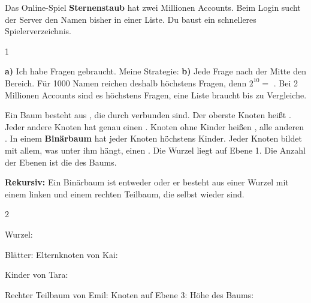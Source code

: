 \documentclass[11pt,a4paper]{article}
\begin{document}

Das Online-Spiel \textbf{Sternenstaub} hat zwei Millionen Accounts. Beim Login sucht der Server den Namen bisher in einer Liste. Du baust ein schnelleres Spielerverzeichnis. 

\begin{aufgabe}{1}
\begin{lueckentext}
\textbf{a)} Ich habe  Fragen gebraucht. Meine Strategie:
\textbf{b)} Jede Frage nach der Mitte  den Bereich. Für 1000 Namen reichen deshalb höchstens  Fragen, denn $2^{10} =$ . Bei 2 Millionen Accounts sind es höchstens  Fragen, eine Liste braucht bis zu  Vergleiche.
\end{lueckentext}
\end{aufgabe}

\begin{merke}
\begin{lueckentext}
Ein Baum besteht aus , die durch  verbunden sind. Der oberste Knoten heißt . Jeder andere Knoten hat genau einen . Knoten ohne Kinder heißen , alle anderen . In einem \textbf{Binärbaum} hat jeder Knoten höchstens  Kinder. Jeder Knoten bildet mit allem, was unter ihm hängt, einen . Die Wurzel liegt auf Ebene 1. Die Anzahl der Ebenen ist die  des Baums.\par
\textbf{Rekursiv:} Ein Binärbaum ist entweder  oder er besteht aus einer Wurzel mit einem linken und einem rechten Teilbaum, die selbst wieder  sind.
\end{lueckentext}
\end{merke}

\begin{aufgabe}{2}
\begin{minipage}[t]{0.5\linewidth}
\vspace{0pt}\centering
\verzeichnisbaum[scale=0.98,every node/.append style={transform shape}]
\end{minipage}\hfill
\begin{minipage}[t]{0.47\linewidth}
\vspace{0pt}\lueckentext
Wurzel: \par
Blätter: 
Elternknoten von Kai: \par
Kinder von Tara: \par
Rechter Teilbaum von Emil: 
Knoten auf Ebene 3: 
Höhe des Baums: 
\end{minipage}
\end{aufgabe}
\end{document}
